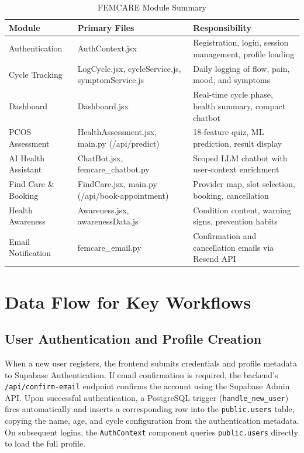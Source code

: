 \begin{table}[h!]
\centering
\caption{FEMCARE Module Summary}
\label{tab:modules}
\renewcommand{\arraystretch}{1.4}
\begin{tabular}{|p{3.8cm}|p{3.5cm}|p{5.5cm}|}
\hline
\rowcolor[HTML]{D9D9D9}
\textbf{Module} & \textbf{Primary Files} & \textbf{Responsibility} \\
\hline
Authentication & AuthContext.jsx & Registration, login, session management, profile loading \\
\hline
Cycle Tracking & LogCycle.jsx, cycleService.js, symptomService.js & Daily logging of flow, pain, mood, and symptoms \\
\hline
Dashboard & Dashboard.jsx & Real-time cycle phase, health summary, compact chatbot \\
\hline
PCOS Assessment & HealthAssessment.jsx, main.py (/api/predict) & 18-feature quiz, ML prediction, result display \\
\hline
AI Health Assistant & ChatBot.jsx, femcare\_chatbot.py & Scoped LLM chatbot with user-context enrichment \\
\hline
Find Care \& Booking & FindCare.jsx, main.py (/api/book-appointment) & Provider map, slot selection, booking, cancellation \\
\hline
Health Awareness & Awareness.jsx, awarenessData.js & Condition content, warning signs, prevention habits \\
\hline
Email Notification & femcare\_email.py & Confirmation and cancellation emails via Resend API \\
\hline
\end{tabular}
\end{table}

\section{Data Flow for Key Workflows}
\label{sec:dataflow}

\subsection{User Authentication and Profile Creation}
\label{subsec:flow-auth}

When a new user registers, the frontend submits credentials and profile metadata to Supabase Authentication. If email confirmation is required, the backend's \texttt{/api/confirm-email} endpoint confirms the account using the Supabase Admin API. Upon successful authentication, a PostgreSQL trigger (\texttt{handle\_new\_user}) fires automatically and inserts a corresponding row into the \texttt{public.users} table, copying the name, age, and cycle configuration from the authentication metadata. On subsequent logins, the \texttt{AuthContext} component queries \texttt{public.users} directly to load the full profile.

